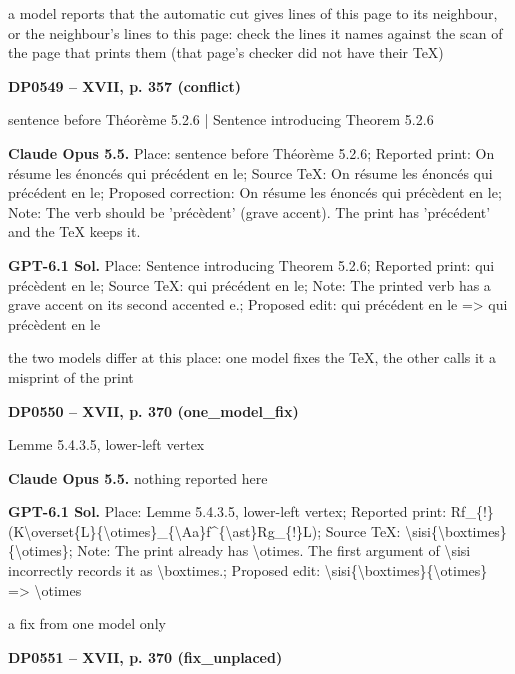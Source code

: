 a model reports that the automatic cut gives lines of this page to its neighbour, or the neighbour's lines to this page: check the lines it names against the scan of the page that prints them (that page's checker did not have their TeX)\par
\par\noindent\hypertarget{DP0549}{}\textbf{DP0549 -- XVII, p. 357 (conflict)}\par
sentence before Théorème 5.2.6 | Sentence introducing Theorem 5.2.6\par
\textbf{Claude Opus 5.5.} Place: sentence before Théorème 5.2.6; Reported print: On résume les énoncés qui précédent en le; Source TeX: On résume les énoncés qui précédent en le; Proposed correction: On résume les énoncés qui précèdent en le; Note: The verb should be 'précèdent' (grave accent). The print has 'précédent' and the TeX keeps it.\par
\textbf{GPT-6.1 Sol.} Place: Sentence introducing Theorem 5.2.6; Reported print: qui précèdent en le; Source TeX: qui précédent en le; Note: The printed verb has a grave accent on its second accented e.; Proposed edit: qui précédent en le =\allowbreak > qui précèdent en le\par
the two models differ at this place: one model fixes the TeX, the other calls it a misprint of the print\par
\par\noindent\hypertarget{DP0550}{}\textbf{DP0550 -- XVII, p. 370 (one\_model\_fix)}\par
Lemme 5.4.3.5, lower-left vertex\par
\textbf{Claude Opus 5.5.} nothing reported here\par
\textbf{GPT-6.1 Sol.} Place: Lemme 5.4.3.5, lower-left vertex; Reported print: Rf\_\{!\}(K\textbackslash{}overset\{L\}\{\textbackslash{}otimes\}\_\{\textbackslash{}Aa\}f\textasciicircum{}\{\textbackslash{}ast\}Rg\_\{!\}L); Source TeX: \textbackslash{}sisi\{\textbackslash{}boxtimes\}\{\textbackslash{}otimes\}; Note: The print already has \textbackslash{}otimes. The first argument of \textbackslash{}sisi incorrectly records it as \textbackslash{}boxtimes.; Proposed edit: \textbackslash{}sisi\{\textbackslash{}boxtimes\}\{\textbackslash{}otimes\} =\allowbreak > \textbackslash{}otimes\par
a fix from one model only\par
\par\noindent\hypertarget{DP0551}{}\textbf{DP0551 -- XVII, p. 370 (fix\_unplaced)}\par

